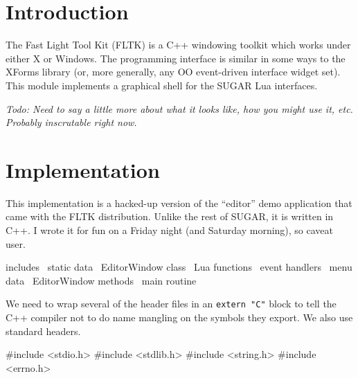 
\section{Introduction}

The Fast Light Tool Kit (FLTK) is a C++ windowing toolkit which works
under either X or Windows.  The programming interface is similar in
some ways to the XForms library (or, more generally, any OO event-driven
interface widget set).  This module implements a graphical shell for
the SUGAR Lua interfaces.

\emph{Todo: Need to say a little more about what it looks like, 
      how you might use it, etc.  Probably inscrutable right now.}


\section{Implementation}

This implementation is a hacked-up version of the ``editor'' demo application
that came with the FLTK distribution.  Unlike the rest of SUGAR, it is
written in C++.  I wrote it for fun on a Friday night (and Saturday morning), 
so caveat user.

\endmoddef
\LA{}includes~{\nwtagstyle{}}\RA{}
\LA{}static data~{\nwtagstyle{}}\RA{}
\LA{}\code{}EditorWindow\edoc{} class~{\nwtagstyle{}}\RA{}
\LA{}Lua functions~{\nwtagstyle{}}\RA{}
\LA{}event handlers~{\nwtagstyle{}}\RA{}
\LA{}menu data~{\nwtagstyle{}}\RA{}
\LA{}\code{}EditorWindow\edoc{} methods~{\nwtagstyle{}}\RA{}
\LA{}main routine~{\nwtagstyle{}}\RA{}
\nwendcode{}\nwdocspar

We need to wrap several of the header files in an {\tt{}extern\ "C"}
block to tell the C++ compiler not to do name mangling on the
symbols they export.  We also use standard headers.

\nwenddocs{}\endmoddef
#include <stdio.h>
#include <stdlib.h>
#include <string.h>
#include <errno.h>

